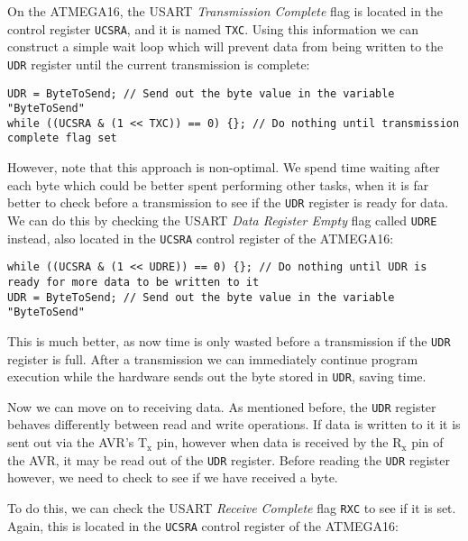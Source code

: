 \documentclass[a4paper,oneside,notitlepage]{book}
\newcommand{\subscript}[1]{\ensuremath{_{\textrm{#1}}}}
\begin{document}
On the ATMEGA16, the USART \emph{Transmission Complete} flag is located in the control register \texttt{UCSRA}, and it is named \texttt{TXC}. Using this information we can construct a simple wait loop which will prevent data from being written to the \texttt{UDR} register until the current transmission is complete:

\begin{center}
\begin{lstlisting}
UDR = ByteToSend; // Send out the byte value in the variable "ByteToSend"
while ((UCSRA & (1 << TXC)) == 0) {}; // Do nothing until transmission complete flag set
\end{lstlisting}
\end{center}

However, note that this approach is non-optimal. We spend time waiting after each byte which could be better spent performing other tasks, when it is far better to check before a transmission to see if the \texttt{UDR} register is ready for data. We can do this by checking the USART \emph{Data Register Empty} flag called \texttt{UDRE} instead, also located in the \texttt{UCSRA} control register of the ATMEGA16:

\begin{center}
\begin{lstlisting}
while ((UCSRA & (1 << UDRE)) == 0) {}; // Do nothing until UDR is ready for more data to be written to it
UDR = ByteToSend; // Send out the byte value in the variable "ByteToSend"
\end{lstlisting}
\end{center}

This is much better, as now time is only wasted before a transmission if the \texttt{UDR} register is full. After a transmission we can immediately continue program execution while the hardware sends out the byte stored in \texttt{UDR}, saving time.


Now we can move on to receiving data. As mentioned before, the \texttt{UDR} register behaves differently between read and write operations. If data is written to it it is sent out via the AVR's T\subscript{x} pin, however when data is received by the R\subscript{x} pin of the AVR, it may be read out of the \texttt{UDR} register. Before reading the \texttt{UDR} register however, we need to check to see if we have received a byte.

To do this, we can check the USART \emph{Receive Complete} flag \texttt{RXC} to see if it is set. Again, this is located in the \texttt{UCSRA} control register of the ATMEGA16:
\end{document}
